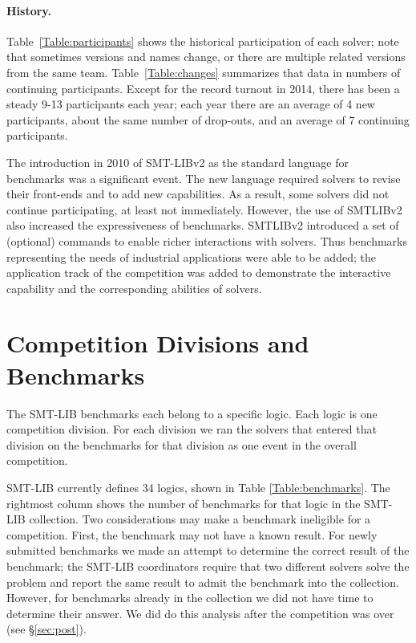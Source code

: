 \documentclass[twoside,11pt]{article}
\begin{document}
\paragraph{History.} Table~\ref{Table:participants} shows the
 historical participation of each solver; note that sometimes versions and names change, or there are multiple related versions from the same team. 
Table~\ref{Table:changes} summarizes that data in numbers of continuing participants. Except for the record turnout in
 2014, there has been a steady 9-13 participants each year; each year there are an average of 4 new
 participants, about the same number of drop-outs, and an average of 7 continuing participants. 

The introduction in 2010 of SMT-LIBv2 as the standard language for benchmarks was a significant event. The new language required solvers to revise their front-ends and to add new capabilities.
As a result, some solvers did not continue participating, at least not immediately. However, the use of SMTLIBv2 also increased the expressiveness of benchmarks. SMTLIBv2 introduced a set of (optional) commands to enable richer interactions with solvers. Thus benchmarks representing the needs of industrial applications were able to be added; 
the application track of the competition was added to demonstrate the interactive capability and the corresponding abilities of solvers.

\section{Competition Divisions and Benchmarks}
\label{sec:benchmarks}

The SMT-LIB benchmarks each belong to a specific logic. Each logic is one competition division. For each division we ran the solvers that entered that division on the benchmarks for that division as one event in the overall competition.

SMT-LIB currently defines 34 logics, shown in Table \ref{Table:benchmarks}. The rightmost column shows the number of benchmarks for that logic in the SMT-LIB collection. Two considerations may make a benchmark ineligible for a competition. First, the benchmark may not have a known result. For newly submitted benchmarks
we made an attempt to determine the correct result of the benchmark; the SMT-LIB coordinators require that two 
different solvers solve the problem and report the same result to admit the benchmark into the collection.
However, for benchmarks already in the collection we did not have time to determine their answer. We did do this analysis after the competition was over (see \S\ref{sec:post}).
\end{document}
